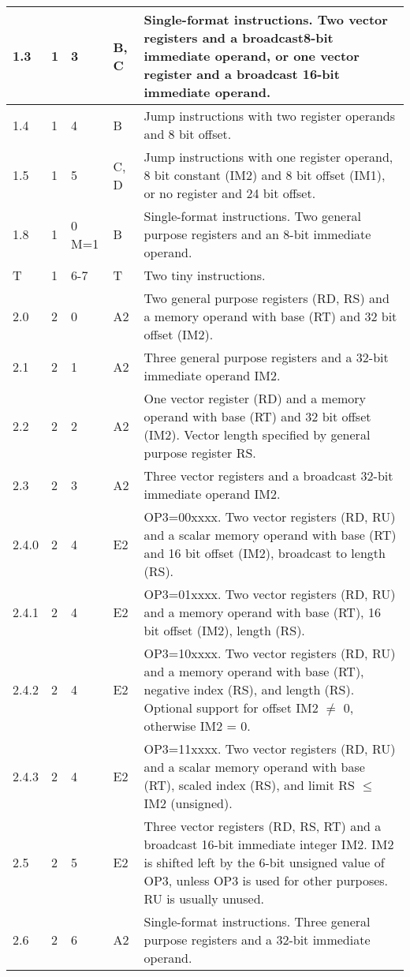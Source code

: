 \documentclass[forwardcom.tex]{subfiles}
\begin{document}
\begin{longtable} {|p{10mm}|p{7mm}|p{7mm}|p{7mm}|p{80mm}|}
1.3 & 1 & 3 & B, C & Single-format instructions. Two vector registers and a broadcast8-bit immediate operand, or one vector register and a broadcast 16-bit immediate operand. \\
\hline
1.4 & 1 & 4 & B & Jump instructions with two register operands and 8 bit offset.  \\
\hline
1.5 & 1 & 5 & C, D & Jump instructions with one register operand, 8 bit constant (IM2) and 8 bit offset (IM1), or no register and 24 bit offset.  \\
\hline
1.8 & 1 & 0 M=1 & B & Single-format instructions. Two general purpose registers and an 8-bit immediate operand. \\
\hline
T & 1 & 6-7 & T & Two tiny instructions. \\
\hline
2.0 & 2 & 0 & A2 & Two general purpose registers (RD, RS) and a memory operand with base (RT) and 32 bit offset (IM2). \\
\hline
2.1 & 2 & 1 & A2 & Three general purpose registers and a 32-bit immediate operand IM2. \\
\hline
2.2 & 2 & 2 & A2 & One vector register (RD) and a memory operand with base (RT) and 32 bit offset (IM2). Vector length specified by general purpose register RS. \\
\hline
2.3 & 2 & 3 & A2 & Three vector registers and a broadcast 32-bit immediate operand IM2. \\
\hline
2.4.0 & 2 & 4 & E2 & OP3=00xxxx. Two vector registers (RD, RU) and a scalar memory operand with base (RT) and 16 bit offset (IM2), broadcast to length (RS). \\
\hline
2.4.1 & 2 & 4 & E2 & OP3=01xxxx. Two vector registers (RD, RU) and a memory operand with base (RT), 16 bit offset (IM2), length (RS). \\
\hline
2.4.2 & 2 & 4 & E2 & OP3=10xxxx. Two vector registers (RD, RU) and a memory operand with base (RT), negative index (RS), and length (RS). Optional support for offset IM2 $\neq$ 0, otherwise IM2 = 0. \\
\hline
2.4.3 & 2 & 4 & E2 & OP3=11xxxx. Two vector registers (RD, RU) and a scalar memory operand with base (RT), scaled index (RS), and limit RS $\leq$ IM2 (unsigned). \\
\hline
2.5 & 2 & 5 & E2 & Three vector registers (RD, RS, RT) and a broadcast 16-bit immediate integer IM2. IM2 is shifted left by the 6-bit unsigned value of OP3, unless OP3 is used for other purposes. RU is usually unused. \\
\hline
2.6 & 2 & 6 & A2 & Single-format instructions. Three general purpose registers and a 32-bit immediate operand. \\

\end{longtable}
\end{document}
